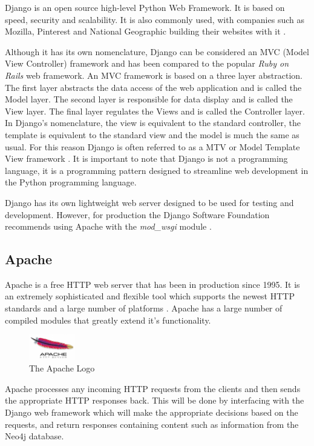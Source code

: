 \documentclass[10pt,onecolumn]{article}
\begin{document}
Django is an open source high-level Python Web Framework. It is based on speed, security and scalability. It is also commonly used, with companies such as Mozilla, Pinterest and National Geographic building their websites with it \cite{django}. 

Although it has its own nomenclature, Django can be considered an MVC (Model View Controller) framework and has been compared to the popular \emph{Ruby on Rails} web framework. An MVC framework is based on a three layer abstraction. The first layer abstracts the data access of the web application and is called the Model layer. The second layer is responsible for data display and is called the View layer. The final layer regulates the Views and is called the Controller layer. In Django's nomenclature, the view is equivalent to the standard controller, the template is equivalent to the standard view and the model is much the same as usual. For this reason Django is often referred to as a MTV or Model Template View framework \cite{djangobook}. It is important to note that Django is not a programming language, it is a programming pattern designed to streamline web development in the Python programming language.

Django has its own lightweight web server designed to be used for testing and development. However, for production the Django Software Foundation recommends using Apache with the \emph{mod\_wsgi} module \cite{djangoApache}.
\subsection{Apache}

Apache is a free HTTP web server that has been in production since 1995. It is an extremely sophisticated and flexible tool which supports the newest HTTP standards and a large number of platforms \cite{apache}. Apache has a large number of compiled modules that greatly extend it's functionality. 
\begin{figure}
  \begin{center}
    \includegraphics[width=0.18\textwidth]{apache}
  \end{center}
  \caption{The Apache Logo}
\end{figure}


Apache processes any incoming HTTP requests from the clients and then sends the appropriate HTTP responses back. This will be done by interfacing with the Django web framework which will make the appropriate decisions based on the requests, and return responses containing content such as information from the Neo4j database. 
\end{document}
